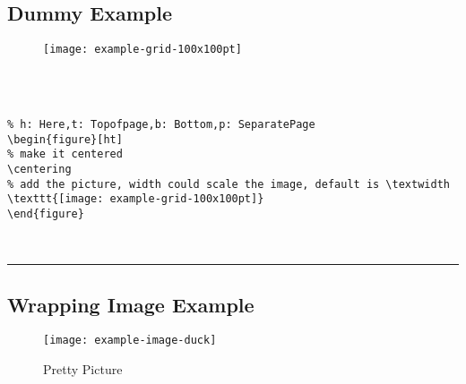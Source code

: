 \documentclass[a4paper,12pt,titlepage]{article}
\begin{document}
\subsection{Dummy Example}
\begin{figure}[H]
\centering
\texttt{[image: example-grid-100x100pt]}
\end{figure}
~\\
\\


\begin{lstlisting}
% h: Here,t: Topofpage,b: Bottom,p: SeparatePage
\begin{figure}[ht]
% make it centered
\centering
% add the picture, width could scale the image, default is \textwidth
\texttt{[image: example-grid-100x100pt]}
\end{figure}
\end{lstlisting}

~\\
\rule{\linewidth}{0.1mm}

\subsection{Wrapping Image Example}
\begingroup

\setlength{\intextsep}{0pt}

\setlength{\columnsep}{15pt}

\begin{wrapfigure}{r}{0.45\textwidth}
\centering
  \texttt{[image: example-image-duck]}
  \caption{Pretty Picture}\label{fig:prettypic}
\end{wrapfigure}
\blindtext

\endgroup
\end{document}
